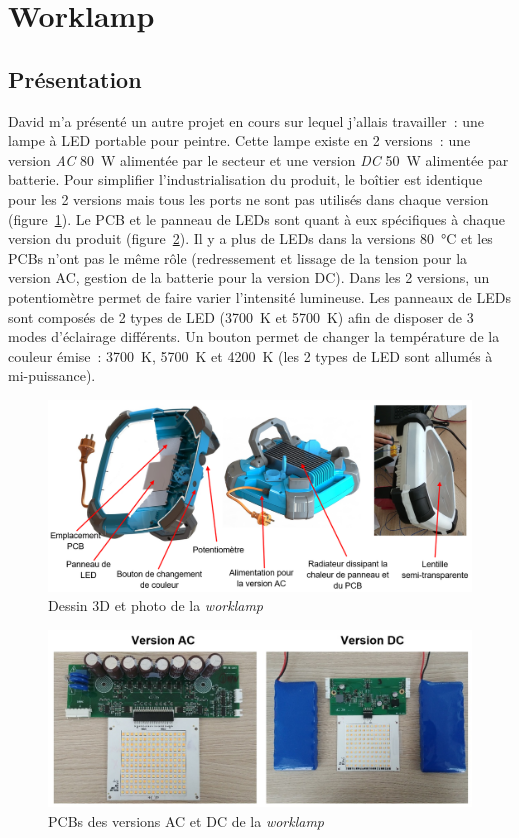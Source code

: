 \documentclass[a4paper, 12pt, sffamily]{report}
\begin{document}
\section{Worklamp}
\subsection{Présentation}
David m’a présenté un autre projet en cours sur lequel j'allais travailler~: une lampe à LED portable pour peintre. Cette lampe existe en 2 versions~: une version \emph{AC} \SI{80}{\watt} alimentée par le secteur et une version \emph{DC} \SI{50}{\watt} alimentée par batterie. Pour simplifier l'industrialisation du produit, le boîtier est identique pour les 2 versions mais tous les ports ne sont pas utilisés dans chaque version (figure~\ref{fig:captioned_worklamp}). Le PCB et le panneau de LEDs sont quant à eux spécifiques à chaque version du produit (figure~\ref{fig:worklamp_PCBs}). Il y a plus de LEDs dans la versions \SI{80}{\celsius} et les PCBs n'ont pas le même rôle (redressement et lissage de la tension pour la version AC, gestion de la batterie pour la version DC).
Dans les 2 versions, un potentiomètre permet de faire varier l'intensité lumineuse. Les panneaux de LEDs sont composés de 2 types de LED (\SI{3700}{\kelvin} et \SI{5700}{\kelvin}) afin de disposer de 3 modes d’éclairage différents. Un bouton permet de changer la température de la couleur émise~: \SI{3700}{\kelvin}, \SI{5700}{\kelvin} et \SI{4200}{\kelvin} (les 2 types de LED sont allumés à mi-puissance). 

\begin{figure}[H]
\centering
\includegraphics[scale=0.45]{figures/screenshots/captioned_worklamp.png}
\caption{Dessin 3D et photo de la \emph{worklamp}}
\label{fig:captioned_worklamp}
\end{figure}

\begin{figure}[H]
\centering
\includegraphics[scale=0.43]{figures/photos/worklamp_PCBs.jpg}
\caption{PCBs des versions AC et DC de la \emph{worklamp}}
\label{fig:worklamp_PCBs}
\end{figure}
\end{document}
